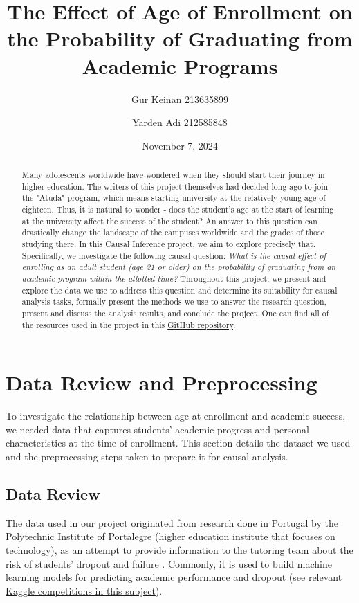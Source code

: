 \documentclass{article}
\title{The Effect of Age of Enrollment on the Probability of Graduating from Academic Programs}
\author{Gur Keinan 213635899 \and Yarden Adi 212585848}
\date{November 7, 2024}
\begin{document}
\maketitle

\begin{abstract}
    Many adolescents worldwide have wondered when they should start their journey in higher education. The writers of this project themselves had decided long ago to join the "Atuda" program, which means starting university at the relatively young age of eighteen. Thus, it is natural to wonder - does the student's age at the start of learning at the university affect the success of the student? An answer to this question can drastically change the landscape of the campuses worldwide and the grades of those studying there. In this Causal Inference project, we aim to explore precisely that. Specifically, we investigate the following causal question: \emph{What is the causal effect of enrolling as an adult student (age 21 or older) on the probability of graduating from an academic program within the allotted time?} Throughout this project, we present and explore the data we use to address this question and determine its suitability for causal analysis tasks, formally present the methods we use to answer the research question, present and discuss the analysis results, and conclude the project. One can find all of the resources used in the project in this \href{https://github.com/GurKeinan/Causal-Inference-Project-Effect-of-Age-on-Graduating}{GitHub repository}.
\end{abstract}

\section{Data Review and Preprocessing}

To investigate the relationship between age at enrollment and academic success, we needed data that captures students' academic progress and personal characteristics at the time of enrollment. This section details the dataset we used and the preprocessing steps taken to prepare it for causal analysis.

\subsection{Data Review}

The data used in our project originated from research done in Portugal by the \href{https://www.ipportalegre.pt/pt/}{Polytechnic Institute of Portalegre} (higher education institute that focuses on technology), as an attempt to provide information to the tutoring team about the risk of students' dropout and failure \citep{data7110146}. Commonly, it is used to build machine learning models for predicting academic performance and dropout (see relevant \href{https://www.kaggle.com/datasets/ankanhore545/dropout-or-academic-success/data}{Kaggle competitions in this subject}).
\end{document}

